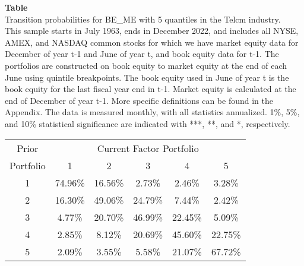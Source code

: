 \begin{table*}[ht!]
\raggedright
{}
\label{tab: transition_probs_BE_ME_Telcm_with_5_quantiles}
\textbf{Table \thetable} \\
Transition probabilities for BE_ME with 5 quantiles in the Telcm industry. \\
\hspace*{1em}This sample starts in July 1963, ends in December 2022, and includes all NYSE, AMEX, and NASDAQ common stocks for which we have market equity data for December of year t-1 and June of year t, and book equity data for t-1. The portfolios are constructed on book equity to market equity at the end of each June using quintile breakpoints.  The book equity used in June of year t is the book equity for the last fiscal year end in t-1.  Market equity is calculated at the end of December of year t-1.  More specific definitions can be found in the Appendix.  The data is measured monthly, with all statistics annualized.  1\%, 5\%, and 10\% statistical significance are indicated with ***, **, and *, respectively. \\
\vspace{0.5em}
\centering
\begin{adjustbox}{max width=\textwidth}
\begin{tabular}{@{}cccccc@{}}
\toprule
Prior & \multicolumn{5}{c}{Current Factor Portfolio} \\
Portfolio & 1 & 2 & 3 & 4 & 5 \\
\midrule
1 & 74.96\% & 16.56\% & 2.73\% & 2.46\% & 3.28\% \\
2 & 16.30\% & 49.06\% & 24.79\% & 7.44\% & 2.42\% \\
3 & 4.77\% & 20.70\% & 46.99\% & 22.45\% & 5.09\% \\
4 & 2.85\% & 8.12\% & 20.69\% & 45.60\% & 22.75\% \\
5 & 2.09\% & 3.55\% & 5.58\% & 21.07\% & 67.72\% \\
\bottomrule
\end{tabular}
\end{adjustbox}
\end{table*}